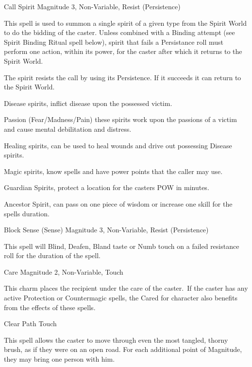 \begin{rpg-spell}
{Call Spirit}
{Magnitude 3, Non-Variable, Resist (Persistence)}

This spell is used to summon a single spirit of a given type from the Spirit World to do the bidding of the caster. Unless combined with a Binding attempt (see Spirit Binding Ritual spell below), spirit that fails a Persistance roll must perform one action, within its power, for the caster after which it returns to the Spirit World.

The spirit resists the call by using its Persistence. If it succeeds it can return to the Spirit World. 

\begin{rpg-list}
\item Disease spirits, inflict disease upon the possessed victim.
\item Passion (Fear/Madness/Pain) these spirits work upon the passions of a victim and cause mental debilitation and distress.
\item Healing spirits, can be used to heal wounds and drive out possessing Disease spirits.
\item Magic spirits, know spells and have power points that the caller may use.
\item Guardian Spirits, protect a location for the casters POW in minutes.
\item Ancestor Spirit, can pass on one piece of wisdom or increase one skill for the spells duration.
\end{rpg-list}
\end{rpg-spell}

 
\begin{rpg-spell}
{Block Sense (Sense)}
{Magnitude 3, Non-Variable, Resist (Persistence)}

This spell will Blind, Deafen, Bland taste or Numb touch on a failed resistance roll for the duration of the spell.
\end{rpg-spell}


\begin{rpg-spell}
{Care}
{Magnitude 2, Non-Variable, Touch}

This charm places the recipient under the care of the caster. If the caster has any active Protection or Countermagic spells, the Cared for character also benefits from the effects of these spells.
\end{rpg-spell}

\begin{rpg-spell}
{Clear Path}
{Touch}

This spell allows the caster to move through even the most tangled, thorny brush, as if they were on an open road. For each additional point of Magnitude, they may bring one person with him. 
\end{rpg-spell}


